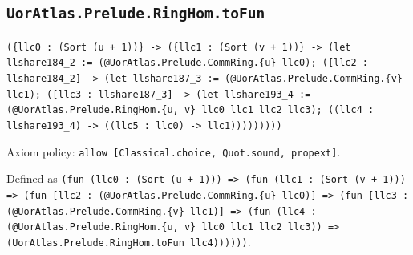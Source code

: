 \documentclass[11pt]{article}
\begin{document}
\subsection*{\texttt{UorAtlas.Prelude.RingHom.toFun}}
\noindent\texttt{(\{llc0 : (Sort (u + 1))\} -> (\{llc1 : (Sort (v + 1))\} -> (let llshare184\_2 := (@UorAtlas.Prelude.CommRing.\{u\} llc0); ([llc2 : llshare184\_2] -> (let llshare187\_3 := (@UorAtlas.Prelude.CommRing.\{v\} llc1); ([llc3 : llshare187\_3] -> (let llshare193\_4 := (@UorAtlas.Prelude.RingHom.\{u, v\} llc0 llc1 llc2 llc3); ((llc4 : llshare193\_4) -> ((llc5 : llc0) -> llc1)))))))))}\par
\noindent Axiom policy: \texttt{allow [Classical.choice, Quot.sound, propext]}.\par
\noindent Defined as \texttt{(fun (llc0 : (Sort (u + 1))) => (fun (llc1 : (Sort (v + 1))) => (fun [llc2 : (@UorAtlas.Prelude.CommRing.\{u\} llc0)] => (fun [llc3 : (@UorAtlas.Prelude.CommRing.\{v\} llc1)] => (fun (llc4 : (@UorAtlas.Prelude.RingHom.\{u, v\} llc0 llc1 llc2 llc3)) => (UorAtlas.Prelude.RingHom.toFun llc4))))))}.\par
\end{document}
